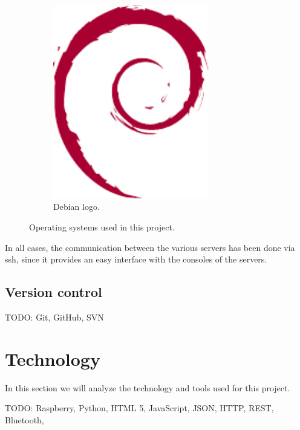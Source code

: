 \begin{figure}[!htbp]
\begin{subfigure}{0.3\textwidth}
		\includegraphics[width=0.75\textwidth]{fig/debian}
		\caption{Debian logo.}\label{subfig:debian}
	\end{subfigure}\quad
	\caption{Operating systems used in this project.}
\end{figure}

In all cases, the communication between the various servers has been done via \acrshort{ssh}, since
it provides an easy interface with the consoles of the servers.

\subsection{Version control}

TODO: Git, GitHub, SVN

\section{Technology}

In this section we will analyze the technology and tools used for this project.




TODO: Raspberry, Python, HTML 5, JavaScript, JSON, HTTP, REST, Bluetooth,
